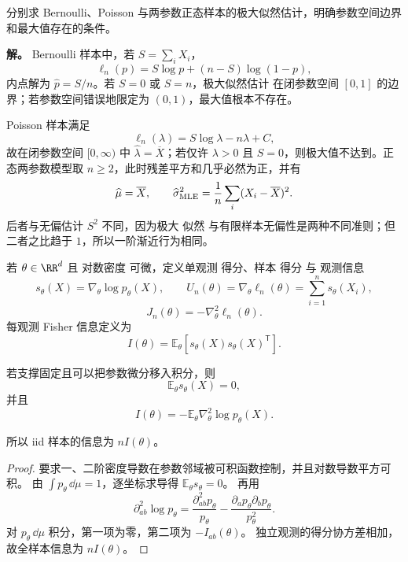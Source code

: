 \begin{exbox}
分别求 Bernoulli、Poisson 与两参数正态样本的极大似然估计，明确参数空间边界和最大值存在的条件。

\textbf{解。} Bernoulli 样本中，若 $S=\sum_iX_i$，
\[
 \ell_n(p)=S\log p+(n-S)\log(1-p),
\]
内点解为 $\widehat p=S/n$。若 $S=0$ 或 $S=n$，极大似然估计 在闭参数空间 $[0,1]$ 的边界；若参数空间错误地限定为 $(0,1)$，最大值根本不存在。

Poisson 样本满足
\[
 \ell_n(\lambda)=S\log\lambda-n\lambda+C,
\]
故在闭参数空间 $[0,\infty)$ 中 $\widehat\lambda=\overline X$；若仅许 $\lambda>0$ 且 $S=0$，则极大值不达到。正态两参数模型取 $n\ge2$，此时残差平方和几乎必然为正，并有
\[
 \widehat\mu=\overline X,
 \qquad
 \widehat\sigma^2_{\rm MLE}
 =\frac1n\sum_i(X_i-\overline X)^2.
\]
后者与无偏估计 $S^2$ 不同，因为极大 似然 与有限样本无偏性是两种不同准则；但二者之比趋于 $1$，所以一阶渐近行为相同。
\end{exbox}

\begin{definition}
若 $\theta\in\RR^d$ 且 对数密度 可微，定义单观测 得分、样本 得分 与 观测信息
\[
 s_\theta(X)=\nabla_\theta\log p_\theta(X),
 \qquad
 U_n(\theta)=\nabla_\theta\ell_n(\theta)
 =\sum_{i=1}^ns_\theta(X_i),
\]
\[
 J_n(\theta)=-\nabla_\theta^2\ell_n(\theta).
\]
每观测 Fisher 信息定义为
\begin{equation*}I(\theta)
 =\mathbb E_\theta[s_\theta(X)s_\theta(X)^{\mathsf T}].
\end{equation*}
\end{definition}

\begin{proposition}[信息恒等式]
若支撑固定且可以把参数微分移入积分，则
\[
 \mathbb E_\theta s_\theta(X)=0,
\]
并且
\[
 I(\theta)
 =-\mathbb E_\theta\nabla_\theta^2\log p_\theta(X).
\]

所以 iid 样本的信息为 $nI(\theta)$。
\end{proposition}
\begin{proof}
要求一、二阶密度导数在参数邻域被可积函数控制，并且对数导数平方可积。
由 $\int p_\theta\,\dd\mu=1$，逐坐标求导得 $\mathbb E_\theta s_\theta=0$。
再用
\[
 \partial_{ab}^2\log p_\theta
 =\frac{\partial_{ab}^2p_\theta}{p_\theta}
 -\frac{\partial_ap_\theta\partial_bp_\theta}{p_\theta^2}.
\]
对 $p_\theta\,\dd\mu$ 积分，第一项为零，第二项为 $-I_{ab}(\theta)$。
独立观测的得分协方差相加，故全样本信息为 $nI(\theta)$。
\end{proof}


